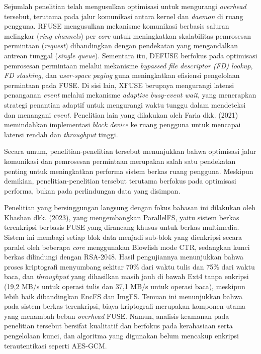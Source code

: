 Sejumlah penelitian telah mengusulkan optimisasi untuk mengurangi \textit{overhead} tersebut, terutama pada jalur komunikasi antara kernel dan \textit{daemon} di ruang pengguna. RFUSE\cite{ChoRFUSE} mengusulkan mekanisme komunikasi berbasis saluran melingkar (\textit{ring channels}) per \textit{core} untuk meningkatkan skalabilitas pemrosesan permintaan (\textit{request}) dibandingkan dengan pendekatan yang mengandalkan antrean tunggal (\textit{single queue}). Sementara itu, DEFUSE\cite{Lembke2022DEFUSE:} berfokus pada optimisasi pemrosesan permintaan melalui mekanisme \textit{bypassed file descriptor (FD) lookup}, \textit{FD stashing}, dan \textit{user-space paging} guna meningkatkan efisiensi pengelolaan permintaan pada FUSE. Di sisi lain, XFUSE\cite{Huai2021XFUSEAI} berupaya mengurangi latensi penanganan \textit{event} melalui mekanisme \textit{adaptive busy-event wait}, yang menerapkan strategi penantian adaptif untuk mengurangi waktu tunggu dalam mendeteksi dan menangani \textit{event}. Penelitian lain yang dilakukan oleh Faria dkk. (2021)\cite{Faria2021BDUS:} memindahkan implementasi \textit{block device} ke ruang pengguna untuk mencapai latensi rendah dan \textit{throughput} tinggi.

Secara umum, penelitian-penelitian tersebut menunjukkan bahwa optimisasi jalur komunikasi dan pemrosesan permintaan merupakan salah satu pendekatan penting untuk meningkatkan performa sistem berkas ruang pengguna. Meskipun demikian, penelitian-penelitian tersebut terutama berfokus pada optimisasi performa, bukan pada perlindungan data yang disimpan.
 
Penelitian yang bersinggungan langsung dengan fokus bahasan ini dilakukan oleh Khashan dkk. (2023)\cite{Khashan2023Dynamic}, yang mengembangkan ParallelFS, yaitu sistem berkas terenkripsi berbasis FUSE yang dirancang khusus untuk berkas multimedia. Sistem ini membagi setiap blok data menjadi sub-blok yang dienkripsi secara paralel oleh beberapa \textit{core} menggunakan Blowfish mode CTR, sedangkan kunci berkas dilindungi dengan RSA-2048. Hasil pengujiannya menunjukkan bahwa proses kriptografi menyumbang sekitar 70\% dari waktu tulis dan 75\% dari waktu baca, dan \textit{throughput} yang dihasilkan masih jauh di bawah Ext4 tanpa enkripsi (19,2 MB/s untuk operasi tulis dan 37,1 MB/s untuk operasi baca), meskipun lebih baik dibandingkan EncFS dan ImgFS. Temuan ini menunjukkan bahwa pada sistem berkas terenkripsi, biaya kriptografi merupakan komponen utama yang menambah beban \textit{overhead} FUSE. Namun, analisis keamanan pada penelitian tersebut bersifat kualitatif dan berfokus pada kerahasiaan serta pengelolaan kunci, dan algoritma yang digunakan belum mencakup enkripsi terautentikasi seperti AES-GCM.
 
